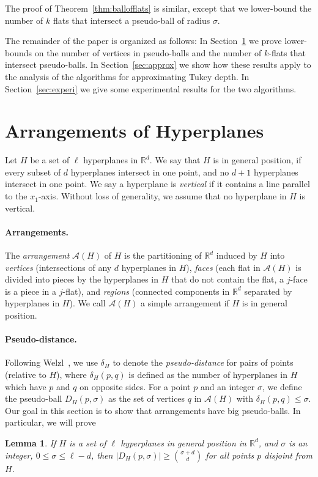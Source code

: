 \documentclass [letterpaper] {article}
\newtheorem{lemma}{Lemma}%
\begin{document}
The proof of Theorem~\ref{thm:ballofflats} is similar, except that we
lower-bound the number of $k$ flats that intersect a pseudo-ball of
radius $\sigma$.

The remainder of the paper is organized as follows:
In Section~\ref{sec:arran} we prove lower-bounds on the number of vertices in pseudo-balls and the number of $k$-flats that intersect pseudo-balls. In Section~\ref{sec:approx} we show how these results apply to the analysis of the algorithms for approximating Tukey depth. In Section~\ref{sec:experi} we give some experimental results for the two algorithms.

\section{Arrangements of Hyperplanes}
\label{sec:arran}

Let $H$ be a set of $\ell$ hyperplanes in $\mathbb{R}^{d}$. We say that $H$ is in general position, if every subset of $d$ hyperplanes intersect in one point, and no $d + 1$ hyperplanes intersect in one point. We say a hyperplane is \emph{vertical} if it contains a line parallel to the $x_{1}$-axis. Without loss of generality, we assume that no hyperplane in $H$ is vertical. 

\paragraph{Arrangements.}
The \emph{arrangement} $\mathcal{A}(H)$ of $H$ is the partitioning of $\mathbb{R}^{d}$ induced by $H$ into \emph{vertices} (intersections of any $d$ hyperplanes in $H$), \emph{faces} (each flat in $\mathcal{A}(H)$ is divided into pieces by the hyperplanes in $H$ that do not contain the flat, a $j$-face is a piece in a $j$-flat), and \emph{regions} (connected components in $\mathbb{R}^{d}$ separated by hyperplanes in $H$). We call $\mathcal{A}(H)$ a simple arrangement if $H$ is in general position. 

\paragraph{Pseudo-distance.}
Following Welzl~\cite{welzl92}, we use $\delta_{H}$ to denote the \emph{pseudo-distance} for pairs of points (relative to $H$), where $\delta_{H}(p,q)$ is defined as the number of hyperplanes in $H$ which have $p$ and $q$ on opposite sides. For a point $p$ and an integer $\sigma$, we define the pseudo-ball $D_{H}(p,\sigma)$ as the set of vertices $q$ in $\mathcal{A}(H)$ with $\delta_{H}(p,q) \leq \sigma$.
Our goal in this section is to show that arrangements have big pseudo-balls. In particular, we will prove
\begin{lemma}
\label{lem:ballofvertices}
  If $H$ is a set of $\ell$ hyperplanes in general position in $\mathbb{R}^{d}$, and $\sigma$ is an integer, $0 \leq \sigma \leq \ell - d$, then $|D_{H}(p,\sigma)| \geq \binom{\sigma+d}{d}$ for all points $p$ disjoint from $H$.
\end{lemma}
\end{document}
